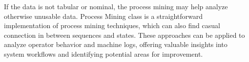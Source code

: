 \documentclass[preprint,12pt, a4paper]{elsarticle}
\begin{document}
If the data is not tabular or nominal, the process mining may help analyze otherwise unusable data. Process Mining class is a straightforward implementation of process mining techniques, which can also find casual connection in between sequences and states. These approaches can be applied to analyze operator behavior and machine logs, offering valuable insights into system workflows and identifying potential areas for improvement.


\end{document}
